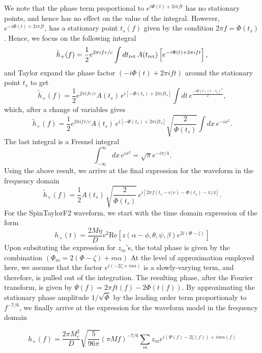 We note that the phase term proportional to $e^{i \Phi(t) + 2 i \pi f
t}$ has no stationary points, and hence has no effect on the value of the
integral. However, $e^{-i \Phi(t) + 2 i \pi f t}$, has a stationary
point $t_s (f)$ given by the condition $2 \pi f = \dot{\Phi}(t_s)$. Hence, we 
focus on the following integral
\begin{equation}
\tilde{h}_{+}(f) = \dfrac{1}{2} e^{2\pi i f r/c} \int dt_{\rm ret}\, A(t_{\rm ret})
 \left[e^{-i \Phi(t) + 2\pi i f t} \right]  \nonumber,
\end{equation}
and Taylor expand the phase factor $(-i \Phi(t) + 2\pi i f t)$ around the
stationary point $t_s$ to get
\begin{equation}
\tilde{h}_{+}(f) = \dfrac{1}{2} e^{2\pi i f r/c} A(t_{s})\,
e^{i  \left[-\Phi(t_s) + 2\pi i f t_s\right]} 
\int dt\, 
e^{\frac{-i \ddot{\Phi}(t) (t - t_s)^2}{2}}, 
\end{equation}
which, after a change of variables gives
\begin{equation}
\tilde{h}_{+}(f) = \dfrac{1}{2} e^{2\pi i f r/c} A(t_{s})\,
e^{i  \left[-\Phi(t_s) + 2\pi i f t_s\right]} 
\sqrt{\dfrac{2}{\ddot{\Phi}(t_s)}}\int dx\, e^{-i x^2}.
\end{equation}
The last integral is a Fresnel integral
\begin{equation}
\int_{-\infty}^{\infty} dx\, e^{i x^2} =  \sqrt{\pi} e^{-i\pi/4}.
\end{equation}
Using the above result, we arrive at the final expression for the waveform in
the frequency domain
\begin{equation}
\tilde{h}_{+}(f) = \dfrac{1}{2} A(t_{s})\,\sqrt{\dfrac{2}{\ddot{\Phi}(t_s)}}\,
e^{i\left[2\pi f(t_s - r/c) - \Phi(t_s) - \pi/4 \right]}.
\end{equation}
For the SpinTaylorF2 waveform, we start with the time domain expression of the
form
\begin{equation}
h_{+}(t) = \dfrac{2 M \eta}{D}v^2 \text{Re} \left[z(\alpha - \phi, \theta,
\psi, \beta) e^{2 i (\Phi - \zeta)}\right]
\end{equation}
Upon subsituting the expression for $z_m$'s, the total phase is given by the
combination $(\Phi_m = 2 (\Phi - \zeta) + m \alpha)$ At the level of
approximation employed here, we assume that the factor $e^{i(-2\zeta +
m\alpha)}$ is a slowly-varying term, and therefore, is pulled out of the
integration. The resulting phase, after the Fourier transform, is given by
$\Psi(f) = 2\pi f t(f) - 2\Phi(t(f))$. By approximating the stationary phase
amplitude $1/\sqrt{\ddot\Phi}$ by the leading order term proportionaly to
$f^{-7/6}$, we finally arrive at the expression for the waveform model in the
frequency domain

\begin{equation}
h_{+}(f) = \dfrac{2\pi M_{c}^{2}}{D}\sqrt{\dfrac{5}{96\pi}}(\pi M
f)^{-7/6}\sum_{m}z_{m}e^{i(\Psi(f) - 2\zeta(f)) + i m \alpha(f)}
\end{equation}